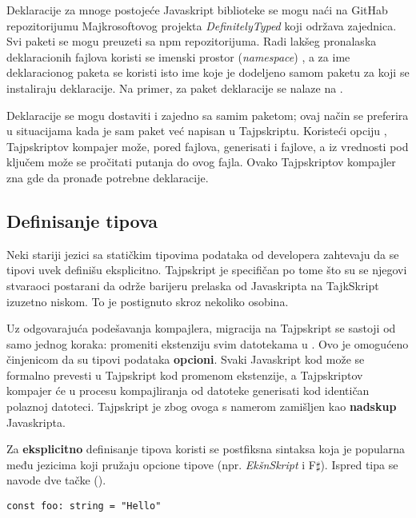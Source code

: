 Deklaracije za mnoge postojeće Javaskript biblioteke se mogu naći na GitHab repozitorijumu Majkrosoftovog projekta \textsl{DefinitelyTyped} koji održava zajednica.
Svi paketi se mogu preuzeti sa npm repozitorijuma.
Radi lakšeg pronalaska deklaracionih fajlova koristi se imenski prostor (\textsl{namespace}) , a za ime deklaracionog paketa se koristi isto ime koje je dodeljeno samom paketu za koji se instaliraju deklaracije.
Na primer, za paket  deklaracije se nalaze na .

Deklaracije se mogu dostaviti i zajedno sa samim paketom; ovaj način se preferira u situacijama kada je sam paket već napisan u Tajpskriptu.
Koristeći opciju , Tajpskriptov kompajer može, pored  fajlova, generisati i  fajlove, a iz  vrednosti pod ključem  može se pročitati putanja do ovog fajla.
Ovako Tajpskriptov kompajler zna gde da pronađe potrebne deklaracije.

\subsection{Definisanje tipova}

Neki stariji jezici sa statičkim tipovima podataka od developera zahtevaju da se tipovi uvek definišu eksplicitno.
Tajpskript je specifičan po tome što su se njegovi stvaraoci postarani da održe barijeru prelaska od Javaskripta na TajkSkript izuzetno niskom.
To je postignuto skroz nekoliko osobina.

Uz odgovarajuća podešavanja kompajlera, migracija na Tajpskript se sastoji od samo jednog koraka: promeniti ekstenziju svim  datotekama u .
Ovo je omogućeno činjenicom da su tipovi podataka \textbf{opcioni}.
Svaki Javaskript kod može se formalno prevesti u Tajpskript kod promenom ekstenzije, a Tajpskriptov kompajer će u procesu kompajliranja od  datoteke generisati kod identičan polaznoj  datoteci.
Tajpskript je zbog ovoga s namerom zamišljen kao \textbf{nadskup} Javaskripta.

Za \textbf{eksplicitno} definisanje tipova koristi se postfiksna sintaksa koja je popularna među jezicima koji pružaju opcione tipove (npr. \textsl{EkšnSkript} i F$\sharp$).
Ispred tipa se navode dve tačke (\code{:}).

\begin{verbatim}
const foo: string = "Hello"
\end{verbatim}

